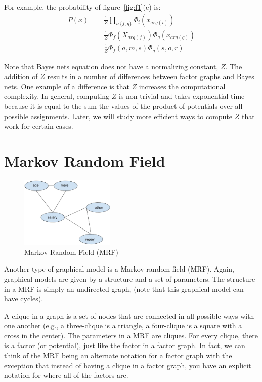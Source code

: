 \documentclass[twoside]{article}
\begin{document}
For example, the probability of figure~\ref{fig:f1}(c) is:
\begin{equation*}
\begin{split}
P(x) & =\frac{1}{Z}\prod_{i\epsilon\{f,g\}}\Phi_i(x_{arg(i)}) \\
& =\frac{1}{Z}\Phi_f(X_{arg(f)})\Phi_g(x_{arg(g)}) \\
& =\frac{1}{Z}\Phi_f(a,m,s)\Phi_g(s,o,r)
\end{split}
\end{equation*}

Note that Bayes nets equation does not have a normalizing constant, $Z$.
The addition of $Z$ results in a number of differences between factor graphs and Bayes nets.
One example of a difference is that $Z$ increases the computational complexity.
In general, computing $Z$ is non-trivial and takes exponential time because it is equal to the sum 
the values of the product of potentials over all possible assignments.
Later, we will study more efficient ways to compute $Z$ that work for certain cases.

\section{Markov Random Field}
\begin{figure}[h]
\caption{Markov Random Field (MRF)}
\label{fig:f3}
\centering
\includegraphics[width=0.4\textwidth]{MRF}
\end{figure}

Another type of graphical model is a Markov random field (MRF).
Again, graphical models are given by a structure and a set of parameters.
The structure in a MRF is simply an undirected graph, (note that this graphical model can have cycles).

A clique in a graph is a set of nodes that are connected in all possible ways with one another 
(e.g., a three-clique is a triangle, a four-clique is a square with a cross in the center).
The parameters in a MRF are cliques.
For every clique, there is a factor (or potential), just like the factor in a factor graph.
In fact, we can think of the MRF being an alternate notation for a factor graph 
with the exception that
 instead of having a clique in a factor graph, you have an explicit notation for where all of the factors are.
\end{document}
